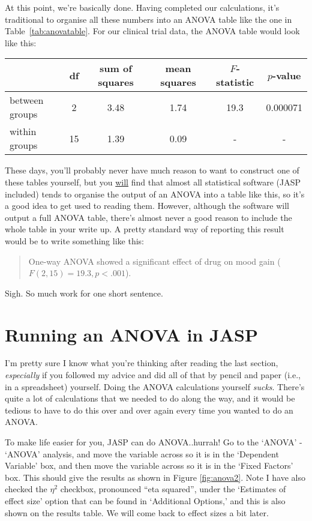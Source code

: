 At this point, we're basically done. Having completed our calculations, it's traditional to organise all these numbers into an ANOVA table like the one in Table~\ref{tab:anovatable}. For our clinical trial data, the ANOVA table would look like this:
\begin{center}
\begin{tabular}{l|ccccc} 
& df & sum of squares & mean squares & $F$-statistic & $p$-value \\  \hline 
between groups & 2 & 3.48 & 1.74 & 19.3 & 0.000071 \\
within groups   & 15 & 1.39 & 0.09 & - & - \\ 
\end{tabular}
\end{center}
\noindent
These days, you'll probably never have much reason to want to construct one of these tables yourself, but you \underline{will} find that almost all statistical software (JASP included) tends to organise the output of an ANOVA into a table like this, so it's a good idea to get used to reading them. However, although the software will output a full ANOVA table, there's almost never a good reason to include the whole table in your write up. A pretty standard way of reporting this result would be to write something like this:
\begin{quote}
One-way ANOVA showed a significant effect of drug on mood gain ($F(2,15) = 19.3, p<.001$).
\end{quote}
Sigh. So much work for one short sentence.


\section{Running an ANOVA in JASP \label{sec:introduceaov}}

I'm pretty sure I know what you're thinking after reading the last section, {\it especially} if you followed my advice and did all of that by pencil and paper (i.e., in a spreadsheet) yourself. Doing the ANOVA calculations yourself {\it sucks}. There's quite a lot of calculations that we needed to do along the way, and it would be tedious to have to do this over and over again every time you wanted to do an ANOVA. 


To make life easier for you, JASP can do ANOVA..hurrah! Go to the `ANOVA' - `ANOVA' analysis, and move the  variable across so it is in the `Dependent Variable' box, and then move the  variable across so it is in the `Fixed Factors' box. This should give the results as shown in Figure \ref{fig:anova2}.  Note I have also checked the $\eta^2$ checkbox, pronounced ``eta squared'', under the `Estimates of effect size' option that can be found in `Additional Options,' and this is also shown on the results table. We will come back to effect sizes a bit later.

